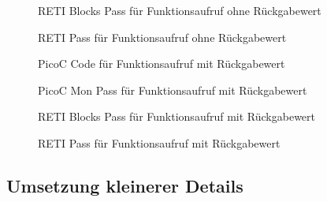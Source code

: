 \begin{figure}[H]
  \centering
  \caption{RETI Blocks Pass für Funktionsaufruf ohne Rückgabewert}
  \label{fig:reti_blocks_pass_für_funktionsaufruf_ohne_rückgabewert}
\end{figure}

\begin{figure}[H]
  \centering
  \caption{RETI Pass für Funktionsaufruf ohne Rückgabewert}
  \label{fig:reti_pass_für_funktionsaufruf_ohne_rückgabewert}
\end{figure}


\begin{figure}[H]
  \centering
  \caption{PicoC Code für Funktionsaufruf mit Rückgabewert}
  \label{fig:picoc_code_für_funktionsaufruf_mit_rückgabewert}
\end{figure}

\begin{figure}[H]
  \centering
  \caption{PicoC Mon Pass für Funktionsaufruf mit Rückgabewert}
  \label{fig:picoc_mon_pass_für_funktionsaufruf_mit_rückgabewert}
\end{figure}

\begin{figure}[H]
  \centering
  \caption{RETI Blocks Pass für Funktionsaufruf mit Rückgabewert}
  \label{fig:reti_blocks_pass_für_funktionsaufruf_mit_rückgabewert}
\end{figure}

\begin{figure}[H]
  \centering
  \caption{RETI Pass für Funktionsaufruf mit Rückgabewert}
  \label{fig:reti_pass_für_funktionsaufruf_mit_rückgabewert}
\end{figure}



\subsection{Umsetzung kleinerer Details}
